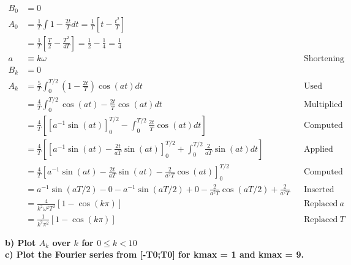 \begin{align*}
	B_0 &= 0\\
    A_0 &= \frac{1}{T} \int 1 - \frac{2t}{T} dt
    = \frac{1}{T} \left[ t - \frac{t^2}{T} \right]\\
    &= \frac{1}{T} \left[ \frac{T}{2} - \frac{T^2}{4T} \right]
    = \frac{1}{2} - \frac{1}{4} = \frac{1}{4}\\
	a &\equiv k\omega & & \text{Shortening notation}\\
	B_k &= 0\\
	A_k &= \frac{5}{T} \int_0^{T/2} \left( 1-\frac{2t}{T} \right) \cos(at) dt & & \text{Used symmetry and odd property}\\
	&= \frac{4}{T} \int_0^{T/2} \cos(at)-\frac{2t}{T} \cos(at) dt & & \text{Multiplied cosine}\\
	&= \frac{4}{T} \left[ \left[ a^{-1} \sin(at) \right]_0^{T/2} - \int_0^{T/2} \frac{2t}{T} \cos(at) dt \right] & & \text{Computed first integral}\\
	&= \frac{4}{T} \left[ \left[ a^{-1} \sin(at) - \frac{2t}{aT} \sin(at) \right]_0^{T/2} + \int_0^{T/2} \frac{2}{aT} \sin(at) dt \right] & & \text{Applied product rule}\\
	&= \frac{4}{T} \left[ a^{-1} \sin(at) - \frac{2t}{aT} \sin(at) - \frac{2}{a^2T} \cos(at)  \right]_0^{T/2} & & \text{Computed second integral} \\
	&= a^{-1} \sin(aT/2) - 0
		- a^{-1} \sin(aT/2) + 0
		- \frac{2}{a^2T} \cos(aT/2) + \frac{2}{a^2T} & & \text{Inserted boundaries}\\
	&= \frac{4}{k^2\omega^2T^2} [1 - \cos(k\pi) ] & & \text{Replaced}\ a\\
	&= \frac{1}{k^2\pi^2} [1 - \cos(k\pi) ] & & \text{Replaced}\ T
\end{align*}

\newpage

\textbf{b) Plot $A_k$ over $k$ for $0 \leq k < 10$}\\

\textbf{c) Plot the Fourier series from [-T0;T0] for kmax = 1 and kmax = 9.}
\\





